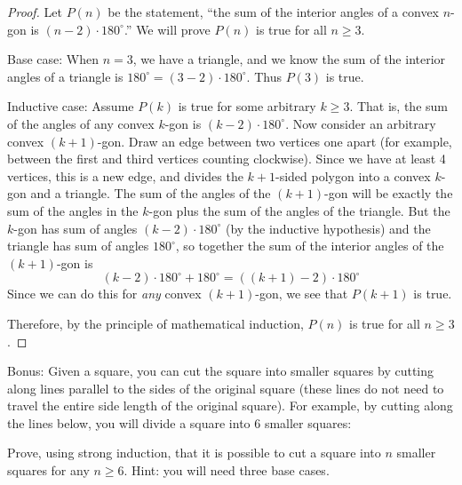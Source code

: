 \documentclass[10pt]{exam}
\begin{document}
\begin{questions}
\begin{solution}
\begin{proof}
Let $P(n)$ be the statement, ``the sum of the interior angles of a convex $n$-gon is $(n-2)\cdot 180^\circ$.''  We will prove $P(n)$ is true for all $n \ge 3$.

Base case: When $n=3$, we have a triangle, and we know the sum of the interior angles of a triangle is $180^\circ = (3-2)\cdot 180^\circ$.  Thus $P(3)$ is true.

Inductive case: Assume $P(k)$ is true for some arbitrary $k \ge 3$.  That is, the sum of the angles of any convex $k$-gon is $(k-2)\cdot 180^\circ$.  Now consider an arbitrary convex $(k+1)$-gon.  Draw an edge between two vertices one apart (for example, between the first and third vertices counting clockwise).  Since we have at least 4 vertices, this is a new edge, and divides the $k+1$-sided polygon into a convex $k$-gon and a triangle.  The sum of the angles of the $(k+1)$-gon will be exactly the sum of the angles in the $k$-gon plus the sum of the angles of the triangle.  But the $k$-gon has sum of angles $(k-2)\cdot 180^\circ$ (by the inductive hypothesis) and the triangle has sum of angles $180^\circ$, so together the sum of the interior angles of the $(k+1)$-gon is
\[(k-2)\cdot 180^\circ + 180^\circ = ((k+1)-2)\cdot 180^\circ\]
Since we can do this for \emph{any} convex $(k+1)$-gon, we see that $P(k+1)$ is true.

Therefore, by the principle of mathematical induction, $P(n)$ is true for all $n\ge 3$.

\end{proof}

\end{solution}



\bonusquestion[5] Bonus: Given a square, you can cut the square into smaller squares by cutting along lines parallel to the sides of the original square (these lines do not need to travel the entire side length of the original square).  For example, by cutting along the lines below, you will divide a square into 6 smaller squares:
\begin{center}
\end{center}
Prove, using strong induction, that it is possible to cut a square into $n$ smaller squares for any $n \ge 6$.  Hint: you will need three base cases.



\end{questions}
\end{document}
